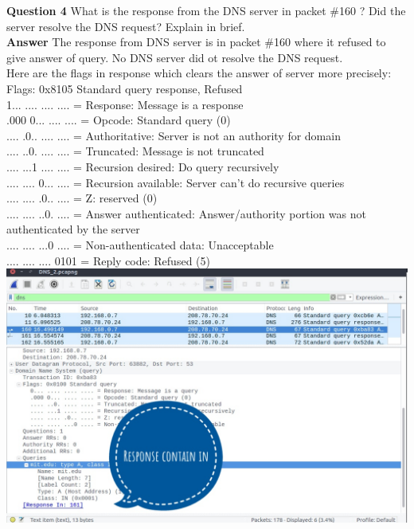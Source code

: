 \documentclass[14pt]{extarticle}
\begin{document}
    \noindent
    \textbf{\large Question 4}
    What is the response from the DNS server in packet \#160 ? 
    Did the server resolve the DNS request? Explain in brief.\\[10pt]
    \textbf{\large Answer}
    The response from DNS server is in packet \#160 where it refused to give answer of query. No DNS server did ot resolve the DNS request.\\
    Here are the flags in response which clears the answer of server more precisely:\\
    Flags: 0x8105 Standard query response, Refused\\
    1... .... .... .... = Response: Message is a response\\
    .000 0... .... .... = Opcode: Standard query (0)\\
    .... .0.. .... .... = Authoritative: Server is not an authority for domain\\
    .... ..0. .... .... = Truncated: Message is not truncated\\
    .... ...1 .... .... = Recursion desired: Do query recursively\\
    .... .... 0... .... = Recursion available: Server can't do recursive queries\\
    .... .... .0.. .... = Z: reserved (0)\\
    .... .... ..0. .... = Answer authenticated: Answer/authority portion was not authenticated by the server\\
    .... .... ...0 .... = Non-authenticated data: Unacceptable\\
    .... .... .... 0101 = Reply code: Refused (5)\\[10pt]
    \includegraphics[scale=0.45]{2_4_1}\\[10pt] 
\end{document}
